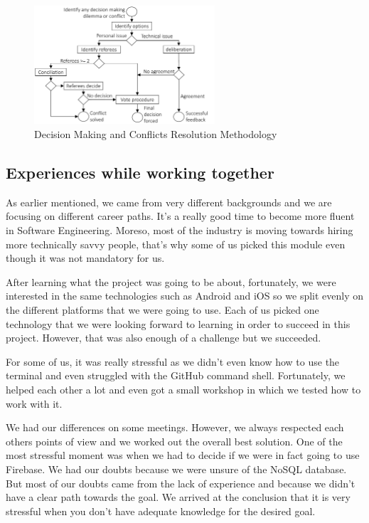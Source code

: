 \begin{figure}[ht]
\centering
\includegraphics[width=0.6\textwidth]{figs/met}
	\caption{Decision Making and Conflicts Resolution Methodology}
	\label{fig:decisions}
\end{figure}




\subsection{Experiences while working together}

As earlier mentioned, we came from very different backgrounds and we are focusing on different career paths. It's a really good time to become more fluent in Software Engineering. Moreso, most of the industry is moving towards hiring more technically savvy people, that's why some of us picked this module even though it was not mandatory for us.

After learning what the project was going to be about, fortunately, we were interested in the same technologies such as Android and iOS so we split evenly on the different platforms that we were going to use. Each of us picked one technology that we were looking forward to learning in order to succeed in this project. However, that was also enough of a challenge but we succeeded.


For some of us, it was really stressful as we didn't even know how to use the terminal and even struggled with the GitHub command shell. Fortunately, we helped each other a lot and even got a small workshop in which we tested how to work with it.


We had our differences on some meetings. However, we always respected each others points of view and we worked out the overall best solution.
One of the most stressful moment was when we had to decide if we were in fact going to use Firebase. We had our doubts because we were unsure of the NoSQL database. But most of our doubts came from the lack of experience and because we didn't have a clear path towards the goal. We arrived at the conclusion that it is very stressful when you don't have adequate knowledge for the desired goal. 

